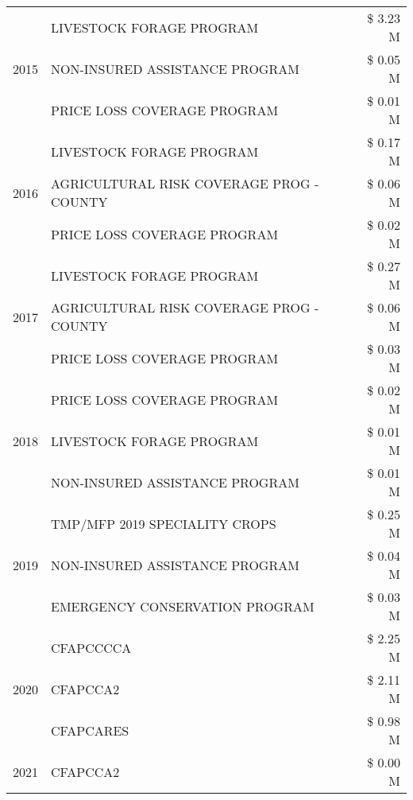\begin{tabular}{llr}
\multirow[t]{3}{*}{2015} & LIVESTOCK FORAGE PROGRAM & \$ 3.23 M \\
 & NON-INSURED ASSISTANCE PROGRAM & \$ 0.05 M \\
 & PRICE LOSS COVERAGE PROGRAM & \$ 0.01 M \\
\cline{1-3}
\multirow[t]{3}{*}{2016} & LIVESTOCK FORAGE PROGRAM & \$ 0.17 M \\
 & AGRICULTURAL RISK COVERAGE PROG - COUNTY & \$ 0.06 M \\
 & PRICE LOSS COVERAGE PROGRAM & \$ 0.02 M \\
\cline{1-3}
\multirow[t]{3}{*}{2017} & LIVESTOCK FORAGE PROGRAM & \$ 0.27 M \\
 & AGRICULTURAL RISK COVERAGE PROG - COUNTY & \$ 0.06 M \\
 & PRICE LOSS COVERAGE PROGRAM & \$ 0.03 M \\
\cline{1-3}
\multirow[t]{3}{*}{2018} & PRICE LOSS COVERAGE PROGRAM & \$ 0.02 M \\
 & LIVESTOCK FORAGE PROGRAM & \$ 0.01 M \\
 & NON-INSURED ASSISTANCE PROGRAM & \$ 0.01 M \\
\cline{1-3}
\multirow[t]{3}{*}{2019} & TMP/MFP 2019 SPECIALITY CROPS & \$ 0.25 M \\
 & NON-INSURED ASSISTANCE PROGRAM & \$ 0.04 M \\
 & EMERGENCY CONSERVATION PROGRAM & \$ 0.03 M \\
\cline{1-3}
\multirow[t]{3}{*}{2020} & CFAPCCCCA & \$ 2.25 M \\
 & CFAPCCA2 & \$ 2.11 M \\
 & CFAPCARES & \$ 0.98 M \\
\cline{1-3}
2021 & CFAPCCA2 & \$ 0.00 M \\
\cline{1-3}
\bottomrule
\end{tabular}
